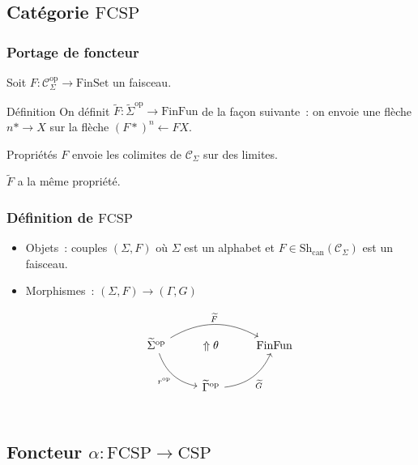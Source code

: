 \documentclass[12pt]{beamer}
\newcommand\csp{\text{CSP}}
\renewcommand\C{\mathscr{C}}
\newcommand\fset{\text{FinSet}}
\newcommand\ffun{\text{FinFun}}
\newcommand\shc{\text{Sh}_\text{can}}
\newcommand{\tsigma}{\widetilde{\Sigma}}
\newcommand{\tgamma}{\widetilde{\Gamma}}
\newcommand{\fcsp}{\text{FCSP}}
\newcommand{\op}{\text{op}}
\newcommand{\tf}{\widetilde{F}}
\newcommand{\tg}{\widetilde{G}}
\begin{document}
\subsection{Catégorie $\fcsp$}

\begin{frame}
    \frametitle{Portage de foncteur}

    Soit $F : \C_\Sigma^\op\rightarrow\fset$ un faisceau.

    \begin{block}{Définition}
        On définit $\tf : \tsigma^\op\rightarrow\ffun$ de la façon suivante~:
        on envoie une flèche $n\ast\rightarrow X$ sur la flèche $(F\ast)^n\leftarrow FX$.
    \end{block}
    \pause
    \begin{exampleblock}{Propriétés}
        $F$ envoie les colimites de $\C_\Sigma$ sur des limites.
        
        $\tf$ a la même propriété.
    \end{exampleblock}
\end{frame}

\begin{frame}
    \frametitle{Définition de $\fcsp$}

    \begin{itemize}[<+->]
        \item Objets~: couples $(\Sigma, F)$ où $\Sigma$ est un alphabet et
            $F\in\shc(\C_\Sigma)$ est un faisceau.

        \item Morphismes~: $(\Sigma,F)\rightarrow(\Gamma,G)$

            \[\begin{tikzcd}[ampersand replacement=\&]
                \tsigma^\op\arrow[dr, bend right, swap, "r^\op"]
                           \arrow[rr, bend left, "\tf"]
                    \& \Uparrow\theta
                    \& \ffun \\
                \& \tgamma^\op\arrow[ur, bend right, swap, "\tg"] \\
            \end{tikzcd}\]
    \end{itemize}
\end{frame}

\subsection[Foncteur $\alpha$]{Foncteur $\alpha : \fcsp\rightarrow\csp$}
\end{document}

